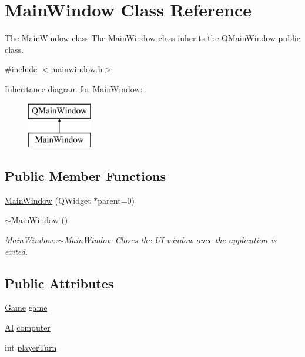 \hypertarget{class_main_window}{\section{Main\-Window Class Reference}
\label{class_main_window}
}


The \hyperlink{class_main_window}{Main\-Window} class The \hyperlink{class_main_window}{Main\-Window} class inherits the Q\-Main\-Window public class.  




{\ttfamily \#include $<$mainwindow.\-h$>$}

Inheritance diagram for Main\-Window\-:\begin{figure}[H]
\begin{center}
\leavevmode
\includegraphics[height=2.000000cm]{class_main_window}
\end{center}
\end{figure}
\subsection*{Public Member Functions}
\begin{DoxyCompactItemize}
\item 
\hyperlink{class_main_window_a8b244be8b7b7db1b08de2a2acb9409db}{Main\-Window} (Q\-Widget $\ast$parent=0)
\item 
\hyperlink{class_main_window_ae98d00a93bc118200eeef9f9bba1dba7}{$\sim$\-Main\-Window} ()
\begin{DoxyCompactList}\small\item\em \hyperlink{class_main_window_ae98d00a93bc118200eeef9f9bba1dba7}{Main\-Window\-::$\sim$\-Main\-Window} Closes the U\-I window once the application is exited. \end{DoxyCompactList}\end{DoxyCompactItemize}
\subsection*{Public Attributes}
\begin{DoxyCompactItemize}
\item 
\hyperlink{class_game}{Game} \hyperlink{class_main_window_a508d487e6a6e565884e8376d6583df10}{game}
\item 
\hyperlink{class_a_i}{A\-I} \hyperlink{class_main_window_a30196d7709d113dbd8262e67e7c629e2}{computer}
\item 
int \hyperlink{class_main_window_ac8f0a233fbd35200774024901d525b25}{player\-Turn}
\end{DoxyCompactItemize}


